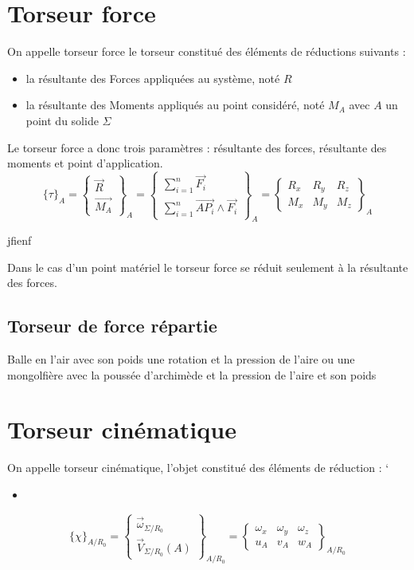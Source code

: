\section{Torseur force}
\begin{defi}
On appelle torseur force le torseur constitué des éléments de réductions suivants :
\begin{itemize}
    \item la résultante des Forces appliquées au système, noté $R$
    \item la résultante des Moments appliqués au point considéré, noté $M_A$ avec $A$ un point du solide $\Sigma$
\end{itemize}
Le torseur force a donc trois paramètres : résultante des forces, résultante des moments et point d'application.
$$\{\tau\}_{A}=\begin{Bmatrix}\overrightarrow{R}\\\overrightarrow{M_A}\end{Bmatrix}_A=\begin{Bmatrix} \displaystyle\sum_{i=1}^{n}\overrightarrow{F_i}\\\displaystyle\sum_{i=1}^{n}\overrightarrow{AP_i}\land\overrightarrow{F_i}\end{Bmatrix}_A=\begin{Bmatrix} R_x & R_y  & R_z\\ M_x & M_y & M_z\end{Bmatrix}_A$$
\end{defi}
\begin{ex}
jfienf
\end{ex}
\begin{rmq}
Dans le cas d'un point matériel le torseur force se réduit seulement à la résultante des forces.
\end{rmq}
\subsection{Torseur de force répartie}

\begin{ex}
     Balle en l'air avec son poids une rotation et la pression de l'aire ou une mongolfière avec la poussée d'archimède et la pression de l'aire et son poids
\end{ex}
\section{Torseur cinématique}
\begin{defi}
On appelle torseur cinématique, l'objet constitué des éléments de réduction :
`\begin{itemize}
    \item 
\end{itemize}
$${\lbrace\chi\rbrace}_{A/R_0}=\begin{Bmatrix}\overrightarrow{\omega}_{\Sigma/R_0}\\\overrightarrow{V}_{\Sigma/R_0}(A)\end{Bmatrix}_{A/R_0}=\begin{Bmatrix} \omega_x & \omega_y  & \omega_z\\ u_A & v_A & w_A\end{Bmatrix}_{A/R_0}$$
\end{defi}
